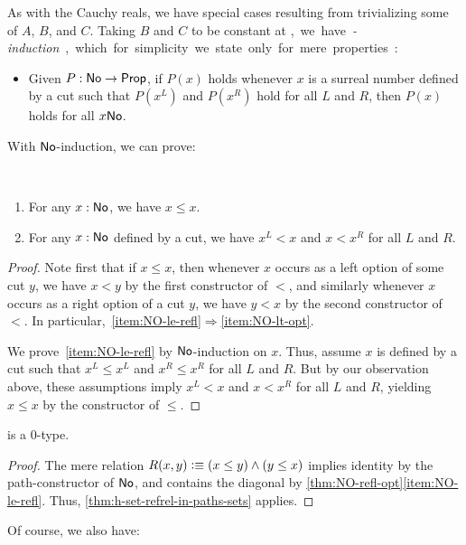 As with the Cauchy reals, we have special cases resulting from trivializing some of $A$, $B$, and $C$.
Taking $B$ and $C$ to be constant at \unit, we have \emph{\NO-induction}, which for simplicity we state only for mere properties:
\begin{itemize}
\item Given $P:\mathsf{No}\to\mathsf{Prop}$, if $P(x)$ holds whenever $x$ is a surreal number defined by a cut such that $P(x^L)$ and $P(x^R)$ hold for all $L$ and $R$, then $P(x)$ holds for all $x\mathsf{No}$.
\end{itemize}
With $\mathsf{No}$-induction, we can prove:

\begin{lem}\label{thm:NO-refl-opt}\ 
  \begin{enumerate}
  \item For any $x:\mathsf{No}$, we have $x\le x$.\label{item:NO-le-refl}
  \item For any $x:\mathsf{No}$ defined by a cut, we have $x^L <x$ and $x<x^R$ for all $L$ and $R$.\label{item:NO-lt-opt}
  \end{enumerate}
\end{lem}
\begin{proof}
  Note first that if $x\le x$, then whenever $x$ occurs as a left option of some cut $y$, we have $x<y$ by the first constructor of $<$, and similarly whenever $x$ occurs as a right option of a cut $y$, we have $y<x$ by the second constructor of $<$.
  In particular,~\ref{item:NO-le-refl}$\Rightarrow$\ref{item:NO-lt-opt}.

  We prove~\ref{item:NO-le-refl} by $\mathsf{No}$-induction on $x$.
  Thus, assume $x$ is defined by a cut such that $x^L\le x^L$ and $x^R \le x^R$ for all $L$ and $R$.
  But by our observation above, these assumptions imply $x^L<x$ and $x<x^R$ for all $L$ and $R$, yielding $x\le x$ by the constructor of $\le$.
\end{proof}

\begin{lem}\label{thm:NO-set}
  \NO is a 0-type.
\end{lem}
\begin{proof}
  The mere relation $R(x,y)\vcentcolon\equiv (x\le y) \land (y\le x)$ implies identity by the path-constructor of $\mathsf{No}$, and contains the diagonal by \autoref{thm:NO-refl-opt}\ref{item:NO-le-refl}.
  Thus, \autoref{thm:h-set-refrel-in-paths-sets} applies.
\end{proof}

Of course, we also have:

